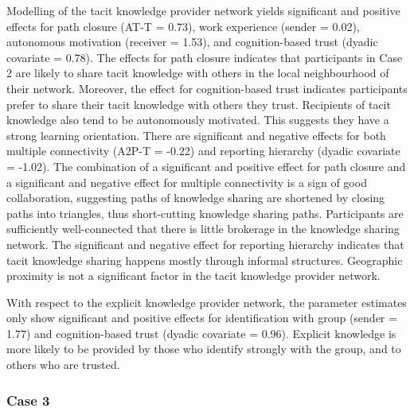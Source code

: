Modelling of the tacit knowledge provider network yields significant and positive effects for path closure (AT-T = 0.73), work experience (sender = 0.02), autonomous motivation (receiver = 1.53), and cognition-based trust (dyadic covariate = 0.78). The effects for path closure indicates that participants in Case 2 are likely to share tacit knowledge with others in the local neighbourhood of their network. Moreover, the effect for cognition-based trust indicates participants prefer to share their tacit knowledge with others they trust. Recipients of tacit knowledge also tend to be autonomously motivated. This suggests they have a strong learning orientation. There are significant and negative effects for both multiple connectivity (A2P-T = -0.22) and reporting hierarchy (dyadic covariate = -1.02). The combination of a significant and positive effect for path closure and a significant and negative effect for multiple connectivity is a sign of good collaboration, suggesting paths of knowledge sharing are shortened by closing paths into triangles, thus short-cutting knowledge sharing paths. Participants are sufficiently well-connected that there is little brokerage in the knowledge sharing network. The significant and negative effect for reporting hierarchy indicates that tacit knowledge sharing happens mostly through informal structures. Geographic proximity is not a significant factor in the tacit knowledge provider network. \medskip

With respect to the explicit knowledge provider network, the parameter estimates only show significant and positive effects for identification with group (sender = 1.77) and cognition-based trust (dyadic covariate = 0.96). Explicit knowledge is more likely to be provided by those who identify strongly with the group, and to others who are trusted.

\subsubsection{Case 3}

